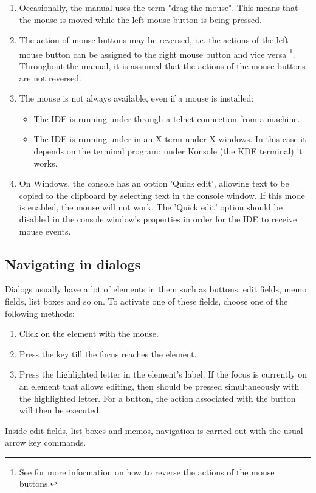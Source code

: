 \begin{remark}
\begin{enumerate}
\item Occasionally, the manual uses the term "drag the mouse". This
means that the mouse is moved while the left mouse button is being
pressed.
\item
The action of mouse buttons may be reversed, i.e. the actions of the left
mouse button can be assigned to the right mouse button and vice versa
\footnote{See  for more information on how to reverse the
actions of the mouse buttons.}. Throughout the manual, it is assumed
that the actions of the mouse buttons are not reversed.
\item
The mouse is not always available, even if a mouse is installed:
\begin{itemize}
\item The IDE is running under \linux through a telnet connection from
a \windows machine.
\item The IDE is running under \linux in an X-term under X-windows. In this
case it depends on the terminal program: under Konsole (the KDE terminal) it
works.
\end{itemize}
\item On Windows, the console has an option 'Quick edit', allowing text
to be copied to the clipboard by selecting text in the console window. If this
mode is enabled, the mouse will not work. The 'Quick edit' option should be
disabled in the console window's properties in order for the IDE to receive mouse
events.
\end{enumerate}
\end{remark}
%
%
\subsection{Navigating in dialogs}
\label{se:navigatingdialogs}
Dialogs usually have a lot of elements in them such as buttons, edit fields,
memo fields, list boxes and so on. To activate one of these fields, choose
one of the following methods:
\begin{enumerate}
\item Click on the element with the mouse.
\item Press the  key till the focus reaches the element.
\item Press the highlighted letter in the element's label. If the focus
is currently on an element that allows editing, then  should be
pressed simultaneously with the highlighted letter. For a button, the action
associated with the button will then be executed.
\end{enumerate}
Inside edit fields, list boxes and memos, navigation is carried out with the
usual arrow key commands.

